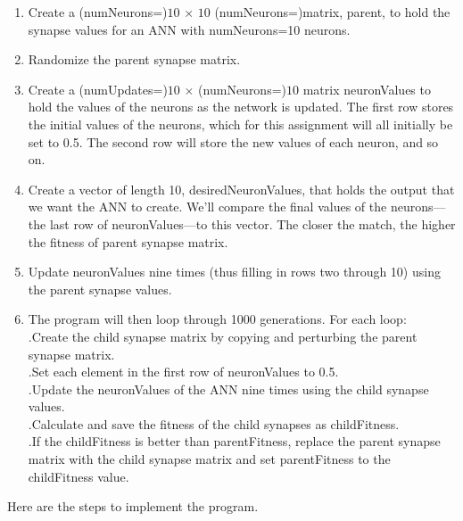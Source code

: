 \documentclass[12pt]{article}
\begin{document}
\begin{enumerate}

\item Create a (numNeurons=)$10$ $\times$ $10$ (numNeurons=)matrix, parent, to hold the synapse values for an ANN with numNeurons=10 neurons.

\item Randomize the parent synapse matrix.

\item Create a (numUpdates=)$10$ $\times$ (numNeurons=)$10$ matrix neuronValues to hold the values of the neurons as the network is updated. The first row stores the initial values of the neurons, which for this assignment will all initially be set to 0.5. The second row will store the new values of each neuron, and so on.

\item Create a vector of length 10, desiredNeuronValues, that holds the output that we want the ANN to create. We'll compare the final values of the neurons---the last row of neuronValues---to this vector. The closer the match, the higher the fitness of parent synapse matrix.

\item Update neuronValues nine times (thus filling in rows two through 10) using the parent synapse values.

\item The program will then loop through 1000 generations. For each loop: \\
.\hspace{1cm}Create the child synapse matrix by copying and perturbing the parent synapse matrix.\\
.\hspace{1cm}Set each element in the first row of neuronValues to 0.5.\\
.\hspace{1cm}Update the neuronValues of the ANN nine times using the child synapse values.\\
.\hspace{1cm}Calculate and save the fitness of the child synapses as childFitness.\\
.\hspace{1cm}If the childFitness is better than parentFitness, replace the parent synapse matrix with the child synapse matrix and set parentFitness to the childFitness value.

\end{enumerate}

Here are the steps to implement the program.
\end{document}
